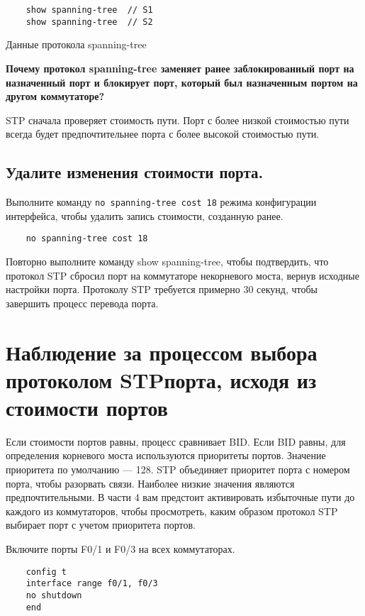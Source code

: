 \begin{verbatim}
    show spanning-tree  // S1
    show spanning-tree  // S2
\end{verbatim}

\begin{image}
	\caption{Данные протокола spanning-tree}
	\label{fig:f6:cast:18}
\end{image}

\textbf{Почему протокол spanning-tree заменяет ранее заблокированный порт
на назначенный порт и блокирует порт,
который был назначенным портом на другом коммутаторе?}

STP сначала проверяет стоимость пути.
Порт с более низкой стоимостью пути всегда
будет предпочтительнее порта с более высокой стоимостью пути.

\subsection{Удалите изменения стоимости порта.}

Выполните команду \texttt{no spanning-tree cost 18} режима конфигурации
интерфейса, чтобы удалить запись стоимости, созданную ранее.

\begin{verbatim}
	no spanning-tree cost 18
\end{verbatim}

Повторно выполните команду show spanning-tree, чтобы подтвердить,
что протокол STP сбросил порт на коммутаторе некорневого моста,
вернув исходные настройки порта. Протоколу STP требуется примерно 30 секунд,
чтобы завершить процесс перевода порта.

\section{Наблюдение за процессом выбора протоколом STPпорта,
	исходя из стоимости портов}
Если стоимости портов равны, процесс сравнивает BID.
Если BID равны, для определения корневого моста используются приоритеты портов.
Значение приоритета по умолчанию --- 128.
STP объединяет приоритет порта с номером порта, чтобы разорвать связи.
Наиболее низкие значения являются предпочтительными.
В части 4 вам предстоит активировать избыточные пути до каждого
из коммутаторов, чтобы просмотреть, каким образом
протокол STP выбирает порт с учетом приоритета портов.

Включите порты F0/1 и F0/3 на всех коммутаторах.

\begin{verbatim}
	config t
	interface range f0/1, f0/3
	no shutdown
	end
\end{verbatim}

